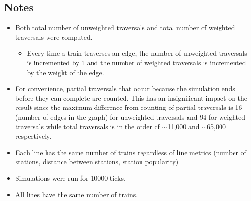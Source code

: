 \documentclass[a4paper,12pt]{article}
\begin{document}
\subsection{Notes}
\begin{itemize}
	\item Both total number of unweighted traversals and total number of weighted traversals were computed.
	      \begin{itemize}
		      \item Every time a train traverses an edge, the number of unweighted traversals is incremented by 1 and the number of weighted traversals is incremented by the weight of the edge.
	      \end{itemize}
	\item For convenience, partial traversals that occur because the simulation ends before they can complete are counted. This has an insignificant impact on the result since the maximum difference from counting of partial traversals is 16 (number of edges in the graph) for unweighted traversals and 94 for weighted traversals while total traversals is in the order of $\sim$11,000 and $\sim$65,000 respectively.
	\item Each line has the same number of trains regardless of line metrics (number of stations, distance between stations, station popularity)
	\item Simulations were run for 10000 ticks.
	\item All lines have the same number of trains.
\end{itemize}
\end{document}
